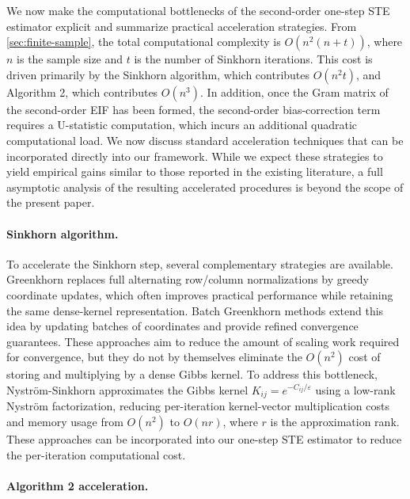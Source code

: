\documentclass{article}
\theoremstyle{plain}
\theoremstyle{definition}
\theoremstyle{remark}
\newcommand{\1}{\mathbbm{1}}
\theoremstyle{plain}
\theoremstyle{definition}
\begin{document}
We now make the computational bottlenecks of the second-order one-step STE estimator explicit and summarize practical acceleration strategies. From \cref{sec:finite-sample}, the total computational complexity is \(O(n^{2}(n+t))\), where $n$ is the sample size and \(t\) is the number of Sinkhorn iterations. This cost is driven primarily by the Sinkhorn algorithm, which contributes \(O(n^{2}t)\), and Algorithm 2, which contributes \(O(n^{3})\). In addition, once the Gram matrix of the second-order EIF has been formed, the second-order bias-correction term requires a U-statistic computation, which incurs an additional quadratic computational load. We now discuss standard acceleration techniques that can be incorporated directly into our framework. While we expect these strategies to yield empirical gains similar to those reported in the existing literature, a full asymptotic analysis of the resulting accelerated procedures is beyond the scope of the present paper.

\paragraph{Sinkhorn algorithm.}
To accelerate the Sinkhorn step, several complementary strategies are available. 
Greenkhorn \citep{altschuler2017near} replaces full alternating row/column normalizations by greedy coordinate updates, which often improves practical performance while retaining the same dense-kernel representation. Batch Greenkhorn methods \citep{kostic2022batch} extend this idea by updating batches of coordinates and provide refined convergence guarantees. These approaches aim to reduce the amount of scaling work required for convergence, but they do not by themselves eliminate the $O(n^2)$ cost of storing and multiplying by a dense Gibbs kernel. To address this bottleneck, Nystr\"om-Sinkhorn \citep{altschuler2019massively} approximates the Gibbs kernel $K_{ij}=e^{-C_{ij}/\varepsilon}$ using a low-rank Nystr\"om factorization, reducing per-iteration kernel-vector multiplication costs and memory usage from $O(n^2)$ to $O(nr)$, where $r$ is the approximation rank. These approaches can be incorporated into our one-step STE estimator to reduce the per-iteration computational cost. 

\paragraph{Algorithm 2 acceleration.}
\end{document}
